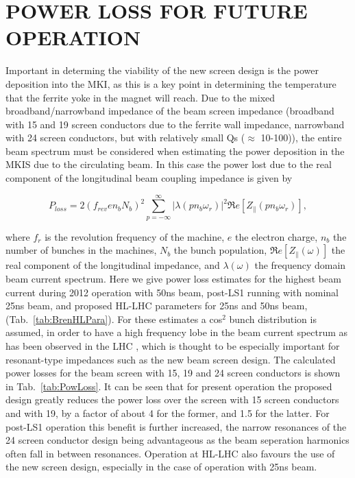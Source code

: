 \documentclass{JAC2003}
\begin{document}
\section{POWER LOSS FOR FUTURE OPERATION}

Important in determing the viability of the new screen design is the power deposition into the MKI, as this is a key point in determining the temperature that the ferrite yoke in the magnet will reach. Due to the mixed broadband/narrowband impedance of the beam screen impedance (broadband with 15 and 19 screen conductors due to the ferrite wall impedance, narrowband with 24 screen conductors, but with relatively small Qs ($\approx$ 10-100)), the entire beam spectrum must be considered when estimating the power deposition in the MKIS due to the circulating beam. In this case the power lost due to the real component of the longitudinal beam coupling impedance is given by 

\begin{equation}
P_{loss} = 2 \left( f_{rev} e n_{b}  N_{b}\right)^{2} \displaystyle\sum\limits_{p = -\infty}^{\infty}  \left| \lambda \left( p n_{b} \omega_{r} \right)  \right|^{2} \Re{}e \left[ Z_{\parallel} \left( p n_{b}\omega_{r} \right) \right],
\label{eqn:heating-gen}
\end{equation} 

where $f_{r}$ is the revolution frequency of the machine, $e$ the electron charge, $n_{b}$ the number of bunches in the machines, $N_{b}$ the bunch population, $\Re{}e[Z_{\parallel}(\omega )]$ the real component of the longitudinal impedance, and $\lambda (\omega )$ the frequency domain beam current spectrum. Here we give power loss estimates for the highest beam current during 2012 operation with 50ns beam, post-LS1 running with nominal 25ns beam, and proposed HL-LHC parameters for 25ns and 50ns beam, (Tab.~\ref{tab:BrenHLPara}). For these estimates a cos$^{2}$ bunch distribution is assumed, in order to have a high frequency lobe in the beam current spectrum as has been observed in the LHC \cite{LHCRF}, which is thought to be especially important for resonant-type impedances such as the new beam screen design. The calculated power losses for the beam screen with 15, 19 and 24 screen conductors is shown in Tab.~\ref{tab:PowLoss}. It can be seen that for present operation the proposed design greatly reduces the power loss over the screen with 15 screen conductors and with 19, by a factor of about 4 for the former, and 1.5 for the latter. For post-LS1 operation this benefit is further increased, the narrow resonances of the 24 screen conductor design being advantageous as the beam seperation harmonics often fall in between resonances. Operation at HL-LHC also favours the use of the new screen design, especially in the case of operation with 25ns beam.
\end{document}

